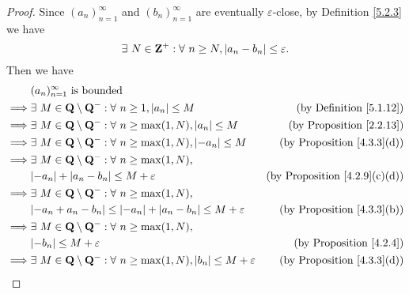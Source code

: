\begin{proof}
    Since \((a_n)_{n = 1}^{\infty}\) and \((b_n)_{n = 1}^{\infty}\) are eventually \(\varepsilon\)-close, by Definition \ref{5.2.3} we have
    \[
        \exists\ N \in \mathbf{Z}^+ : \forall\ n \geq N, \abs*{a_n - b_n} \leq \varepsilon.
    \]
    Then we have
    \begin{align*}
                 & (a_n)_{n = 1}^\infty \text{ is bounded}                                                                                                                    \\
        \implies & \exists\ M \in \mathbf{Q} \setminus \mathbf{Q}^- : \forall\ n \geq 1, \abs*{a_n} \leq M                        & \text{(by Definition \ref{5.1.12})}       \\
        \implies & \exists\ M \in \mathbf{Q} \setminus \mathbf{Q}^- : \forall\ n \geq \max(1, N), \abs*{a_n} \leq M               & \text{(by Proposition \ref{2.2.13})}      \\
        \implies & \exists\ M \in \mathbf{Q} \setminus \mathbf{Q}^- : \forall\ n \geq \max(1, N), \abs*{-a_n} \leq M              & \text{(by Proposition \ref{4.3.3}(d))}    \\
        \implies & \exists\ M \in \mathbf{Q} \setminus \mathbf{Q}^- : \forall\ n \geq \max(1, N),                                                                             \\
                 & \abs*{-a_n} + \abs*{a_n - b_n} \leq M + \varepsilon                                                            & \text{(by Proposition \ref{4.2.9}(c)(d))} \\
        \implies & \exists\ M \in \mathbf{Q} \setminus \mathbf{Q}^- : \forall\ n \geq \max(1, N),                                                                             \\
                 & \abs*{-a_n + a_n - b_n} \leq \abs*{-a_n} + \abs*{a_n - b_n} \leq M + \varepsilon                               & \text{(by Proposition \ref{4.3.3}(b))}    \\
        \implies & \exists\ M \in \mathbf{Q} \setminus \mathbf{Q}^- : \forall\ n \geq \max(1, N),                                                                             \\
                 & \abs*{-b_n} \leq M + \varepsilon                                                                               & \text{(by Proposition \ref{4.2.4})}       \\
        \implies & \exists\ M \in \mathbf{Q} \setminus \mathbf{Q}^- : \forall\ n \geq \max(1, N), \abs*{b_n} \leq M + \varepsilon & \text{(by Proposition \ref{4.3.3}(d))}    \\

\end{align*}
\end{proof}
